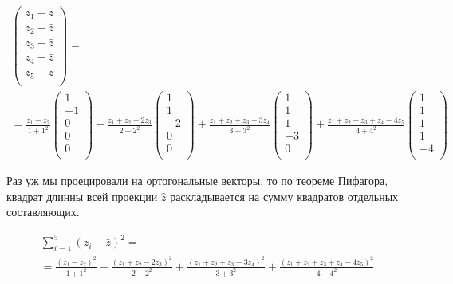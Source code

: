 \documentclass[11pt,russian,]{article}
\newcommand{\1}{\mathbbm{1}}
\begin{document}
\begin{multline}
\nonumber
\begin{pmatrix}
z_1 - \bar z \\
z_2 - \bar z \\
z_3 - \bar z \\
z_4 - \bar z \\
z_5 - \bar z \\
\end{pmatrix} = \\
= \frac{z_1 - z_2}{1+1^2}\begin{pmatrix}
1 \\
-1 \\
0 \\
0 \\
0 \\
\end{pmatrix} + 
\frac{z_1 + z_2 - 2z_3}{2+2^2}\begin{pmatrix}
1 \\
1 \\
-2 \\
0 \\
0 \\
\end{pmatrix} + 
\frac{z_1 + z_2 + z_3 - 3z_4}{3+3^2}\begin{pmatrix}
1 \\
1 \\
1 \\
-3 \\
0 \\
\end{pmatrix} + 
\frac{z_1 + z_2 + z_3 + z_4 - 4z_5}{4+4^2}\begin{pmatrix}
1 \\
1 \\
1 \\
1 \\
-4 \\
\end{pmatrix}
\end{multline}

Раз уж мы проецировали на ортогональные векторы, то по теореме Пифагора,
квадрат длинны всей проекции \(\hat z\) раскладывается на сумму
квадратов отдельных составляющих.

\begin{multline}
\nonumber
\sum_{i=1}^5 (z_i - \bar z)^2 = \\
= \frac{(z_1 - z_2)^2}{1+1^2} + \frac{(z_1 + z_2 - 2z_3)^2}{2+2^2} + \frac{(z_1 + z_2 + z_3 - 3z_4)^2}{3+3^2} + \frac{(z_1 + z_2 + z_3 + z_4 - 4z_5)^2}{4+4^2}
\end{multline}
\end{document}

